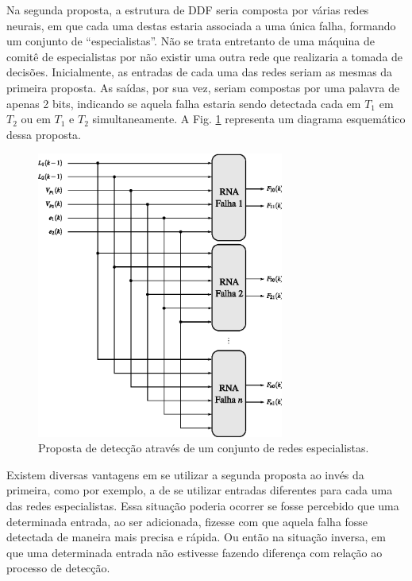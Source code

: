 Na segunda proposta, a estrutura de DDF seria composta por várias redes neurais,
em que cada uma destas estaria associada a uma única falha, formando um conjunto
de ``especialistas''. Não se trata entretanto de uma máquina de comitê de
especialistas por não existir uma outra rede que realizaria a tomada de
decisões. Inicialmente, as entradas de cada uma das redes seriam as mesmas da
primeira proposta. As saídas, por sua vez, seriam compostas por uma palavra de
apenas 2 bits, indicando se aquela falha estaria sendo detectada cada em $T_1$
em $T_2$ ou em $T_1$ e $T_2$ simultaneamente. A Fig. \ref{fig:detec_prop_2}
representa um diagrama esquemático dessa proposta.

\begin{figure}[!htb]
\centering
    \includegraphics[width=0.725\textwidth]{imgs/sistema/eps/detec_prop_2}
    \caption{Proposta de detecção através de um conjunto de redes
             especialistas.}
    \label{fig:detec_prop_2}
\end{figure}

Existem diversas vantagens em se utilizar a segunda proposta ao invés da
primeira, como por exemplo, a de se utilizar entradas diferentes para cada uma
das redes especialistas. Essa situação poderia ocorrer se fosse percebido que
uma determinada entrada, ao ser adicionada, fizesse com que aquela falha fosse
detectada de maneira mais precisa e rápida. Ou então na situação inversa, em que
uma determinada entrada não estivesse fazendo diferença com relação ao processo
de detecção.


